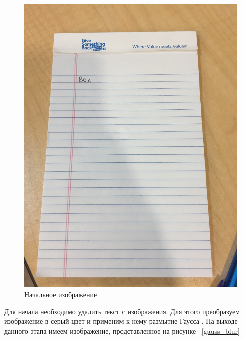 \begin{figure}
    \includegraphics[scale=0.15]{img/perspective/input}
    \caption{Начальное изображение}
    \label{input}
\end{figure}

Для начала необходимо удалить текст с изображения. Для этого преобразуем изображение в серый цвет и применим к нему размытие Гаусса \cite{gauss_blur}. На выходе данного этапа имеем изображение, представленное на рисунке ~\ref{gauss_blur}

